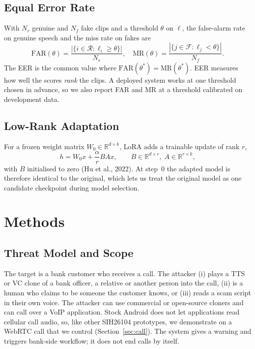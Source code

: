 \documentclass[10pt,a4paper,twocolumn]{article}
\newcommand{\llr}{\ell}
\begin{document}
\subsection{Equal Error Rate}
With $N_r$ genuine and $N_f$ fake clips and a threshold $\theta$ on $\llr$, the false-alarm rate on genuine speech and the miss rate on fakes are
\begin{equation}
\mathrm{FAR}(\theta)=\frac{|\{i\in\mathcal{R}:\llr_i\geq\theta\}|}{N_r},\quad
\mathrm{MR}(\theta)=\frac{|\{j\in\mathcal{F}:\llr_j<\theta\}|}{N_f}.
\label{eq:far}
\end{equation}
The EER is the common value where $\mathrm{FAR}(\theta^{*})=\mathrm{MR}(\theta^{*})$. EER measures how well the scores \emph{rank} the clips. A deployed system works at one threshold chosen in advance, so we also report FAR and MR at a threshold calibrated on development data.

\subsection{Low-Rank Adaptation}
For a frozen weight matrix $W_0\in\mathbb{R}^{d\times k}$, LoRA adds a trainable update of rank $r$,
\begin{equation}
h=W_0x+\frac{\alpha}{r}BAx,\qquad B\in\mathbb{R}^{d\times r},\;A\in\mathbb{R}^{r\times k},
\label{eq:lora}
\end{equation}
with $B$ initialised to zero (Hu et al., 2022). At step~0 the adapted model is therefore identical to the original, which lets us treat the original model as one candidate checkpoint during model selection.

\section{Methods}
\subsection{Threat Model and Scope}
The target is a bank customer who receives a call. The attacker (i) plays a TTS or VC clone of a bank officer, a relative or another person into the call, (ii) is a human who claims to be someone the customer knows, or (iii) reads a scam script in their own voice. The attacker can use commercial or open-source cloners and can call over a VoIP application. Stock Android does not let applications read cellular call audio, so, like other SIH26104 prototypes, we demonstrate on a WebRTC call that we control (Section~\ref{sec:call}). The system gives a warning and triggers bank-side workflow; it does not end calls by itself.
\end{document}
